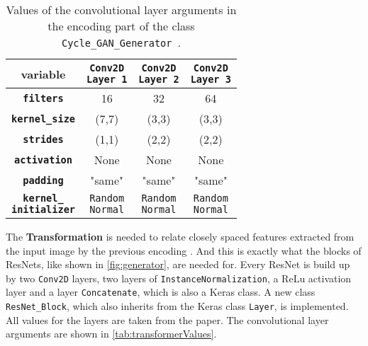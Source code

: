 \documentclass[fleqn,10pt]{SelfArx} %
\begin{document}
\begin{table}[htb]
\centering
\caption{Values of the convolutional layer arguments in the encoding part of the class \texttt{Cycle\_GAN\_Generator}~\cite{image-to-image-ccan}.}
\label{tab:encoderValues}
\begin{tabular}{c c c c}
\textbf{variable} & \makecell[cc]{\textbf{\texttt{Conv2D}} \\ \textbf{\texttt{Layer 1}}} & \makecell[cc]{\textbf{\texttt{Conv2D}} \\ \textbf{\texttt{Layer 2}}} & \makecell[cc]{\textbf{\texttt{Conv2D}} \\ \textbf{\texttt{Layer 3}}} \\ \hline
\textbf{\texttt{filters}} & 16 & 32 & 64 \\ \hline
\textbf{\texttt{kernel\_size}} & (7,7) & (3,3) & (3,3) \\ \hline
\textbf{\texttt{strides}} & (1,1) &  (2,2) & (2,2) \\ \hline
\textbf{\texttt{activation}} & None & None & None \\ \hline 
\textbf{\texttt{padding}} & "same" & "same" & "same" \\ \hline
\makecell[cc]{\textbf{\texttt{kernel\_}} \\ \textbf{\texttt{initializer}}} & \makecell[cc]{\texttt{Random} \\ \texttt{Normal}} & \makecell[cc]{\texttt{Random} \\ \texttt{Normal}} & \makecell[cc]{\texttt{Random} \\ \texttt{Normal}} \\ \hline
\end{tabular}
\end{table}

The \textbf{Transformation} is needed to relate closely spaced features extracted from the input image by the previous encoding \cite{Introduction-to-Cycle-GANs}. And this is exactly what the blocks of \acp{ResNet}, like shown in \autoref{fig:generator}, are needed for. Every \ac{ResNet} is build up by two \texttt{Conv2D} layers, two layers of \texttt{Instance\-Normalization}, a \ac{ReLu} activation layer and a layer \texttt{Concatenate}, which is also a Keras class. A new class \texttt{ResNet\-\_Block}, which also inherits from the Keras class \texttt{Layer}, is implemented. All values for the layers are taken from the paper. The convolutional layer arguments are shown in \autoref{tab:transformerValues}.
\end{document}
